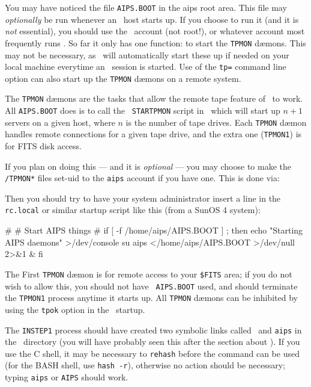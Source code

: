 \medskip{}

You may have noticed the file {\tt AIPS.BOOT} in the aips root area.
This file may {\it optionally\/} be run whenever an \AIPS\ host starts
up.  If you choose to run it (and it is {\it not\/} essential), you
should use the \ttaips\ account (not root!), or whatever account most
frequently runs \ttaips.  So far it only has one function: to start the
{\tt TPMON} d\ae mons.  This may not be necessary, as \ttaips\ will
automatically start these up if needed on your local machine everytime
an \AIPS\ session is started.  Use of the {\tt tp=} command line option
can also start up the {\tt TPMON} d\ae mons on a remote system.

The {\tt TPMON} d\ae mons are the tasks that allow the remote tape
feature of \AIPS\ to work.  All {\tt AIPS.BOOT} does is to call the {\tt
STARTPMON} script in \SYSU\ which will start up $n+1$ servers on a given
host, where $n$ is the number of tape drives.  Each {\tt TPMON} d\ae mon
handles remote connections for a given tape drive, and the extra one
({\tt TPMON1}) is for FITS disk access.

If you plan on doing this --- and it is {\it optional\/} --- you may
choose to make the {\tt\LOAD/TPMON*} files set-uid to the {\tt aips}
account if you have one.  This is done via:\medskip

\medskip

\noindent Then you should try to have your system administrator insert a
line in the {\tt rc.local} or similar startup script like this (from a
SunOS 4 system):\medskip

\fortran
#
# Start AIPS things
#
if [ -f /home/aips/AIPS.BOOT ] ; then
  echo "Starting AIPS daemons" >/dev/console
  su aips </home/aips/AIPS.BOOT >/dev/null 2>&1 &
fi
\endfortran
\medskip

\noindent The First {\tt TPMON} d\ae mon is for remote access to your
{\tt\$FITS}
area; if you do not wish to allow this, you should not have {\tt
AIPS.BOOT} used, and should terminate the {\tt TPMON1} process anytime
it starts up.  All {\tt TPMON} d\ae mons can be inhibited by using the
{\tt tpok} option in the \ttaips\ startup.


\medskip{}

The {\tt INSTEP1} process should have created two symbolic links called
\ttaips\ and {\tt aips} in the \SYSL\ directory (you will have probably
seen this after the section about \AROOT). If you use the C shell, it
may be necessary to {\tt rehash} before the command can be used (for the
BASH shell, use {\tt hash -r}), otherwise no action should be necessary;
typing {\tt aips} or {\tt AIPS} should work.

